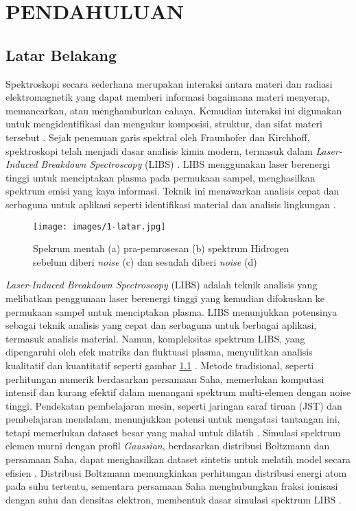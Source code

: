 




\chapter{PENDAHULUAN}



\section{Latar Belakang}


\par  Spektroskopi secara sederhana merupakan  interaksi antara materi dan radiasi elektromagnetik yang dapat memberi informasi bagaimana materi menyerap, memancarkan, atau menghamburkan cahaya. Kemudian interaksi ini  digunakan untuk mengidentifikasi dan mengukur komposisi, struktur, dan sifat materi tersebut \parencite{Hollas2013}.  
Sejak penemuan garis spektral oleh Fraunhofer dan Kirchhoff, spektroskopi telah menjadi dasar analisis kimia modern, termasuk dalam \textit{Laser-Induced Breakdown Spectroscopy} (LIBS) \parencite{Thorne1999}. LIBS menggunakan laser berenergi tinggi untuk menciptakan plasma pada permukaan sampel, menghasilkan spektrum emisi yang kaya informasi. Teknik ini menawarkan analisis cepat dan serbaguna untuk aplikasi seperti identifikasi material dan analisis lingkungan \parencite{Thorne1999}.
\begin{figure}
    \centering
    \texttt{[image: images/1-latar.jpg]}
    \caption{Spekrum mentah (a) pra-pemrosesan (b) spektrum Hidrogen sebelum diberi \textit{noise} (c) dan sesudah diberi \textit{noise} (d) \citep{Gasior2023}}
    \label{fig:kenapa}
\end{figure}

\par \textit{Laser-Induced Breakdown Spectroscopy} (LIBS) adalah teknik analisis yang melibatkan penggunaan laser berenergi tinggi yang kemudian difokuskan ke permukaan sampel untuk menciptakan plasma. LIBS menunjukkan potensinya sebagai teknik analisis yang cepat dan serbaguna untuk berbagai aplikasi, termasuk analisis material. Namun, kompleksitas spektrum LIBS, yang dipengaruhi oleh efek matriks dan fluktuasi plasma, menyulitkan analisis kualitatif dan kuantitatif seperti gambar \ref{fig:kenapa} \parencite{Gasior2023}. Metode tradisional, seperti perhitungan numerik berdasarkan persamaan Saha, memerlukan komputasi intensif dan kurang efektif dalam menangani spektrum multi-elemen dengan noise tinggi. Pendekatan pembelajaran mesin, seperti jaringan saraf tiruan (JST) dan pembelajaran mendalam, menunjukkan potensi untuk mengatasi tantangan ini, tetapi memerlukan dataset besar yang mahal untuk dilatih \parencite{Gasior2023}. Simulasi spektrum elemen murni dengan profil \textit{Gaussian}, berdasarkan distribusi Boltzmann dan persamaan Saha, dapat menghasilkan dataset sintetis untuk melatih model secara efisien \parencite{Pan2024}. Distribusi Boltzmann memungkinkan perhitungan distribusi energi atom pada suhu tertentu, sementara persamaan Saha menghubungkan fraksi ionisasi dengan suhu dan densitas elektron, membentuk dasar simulasi spektrum LIBS \parencite{Thorne1999}.

